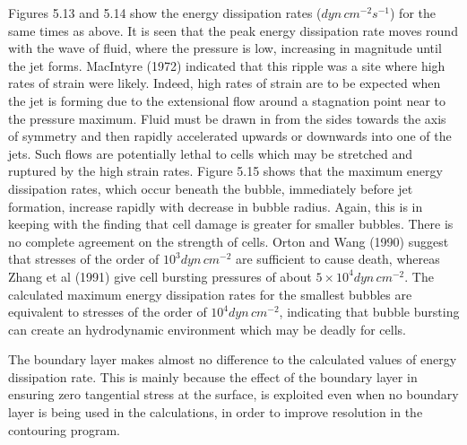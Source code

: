 Figures 5.13 and 5.14 show the energy dissipation rates ($dyn\,cm^{-2} s^{-1}$)
for the same times as above. It is 
seen that the peak energy dissipation rate moves round with the wave of 
fluid, where the pressure is low,
increasing in magnitude until the jet forms. 
MacIntyre (1972) indicated that this ripple was a site where
high rates of strain were likely.
Indeed, high rates of strain are to be expected when the jet is forming due to
the extensional flow around a stagnation point near to the pressure maximum.
Fluid must be drawn in from the sides towards the axis of symmetry and then rapidly
accelerated upwards or downwards into one of the jets.
Such flows are potentially lethal to cells which may be stretched and ruptured
by the high strain rates.
Figure 5.15 shows that the maximum energy dissipation rates, which
occur beneath the
bubble, immediately before jet formation, increase rapidly with decrease in bubble
radius. Again, this is in keeping with the finding that cell damage is 
greater for smaller bubbles. There is no complete agreement
on the strength of cells. Orton and Wang (1990) suggest that
stresses of the order of $10^3dyn\,cm^{-2}$ are sufficient to cause
death, whereas Zhang et al (1991) give cell bursting pressures of
about $5\times 10^4 dyn\,cm^{-2}$. 
The calculated maximum energy 
dissipation rates for the smallest bubbles 
are equivalent to stresses of the order
of $10^4dyn\,cm^{-2}$, indicating that bubble bursting can
create an hydrodynamic environment which may be deadly for cells.

The boundary layer makes almost no difference
to the calculated values of energy dissipation rate. This
is mainly because the effect of the boundary layer in ensuring
zero tangential stress at the surface, is exploited even when no boundary layer 
is being used in the calculations, in order to improve resolution
in the contouring program.

